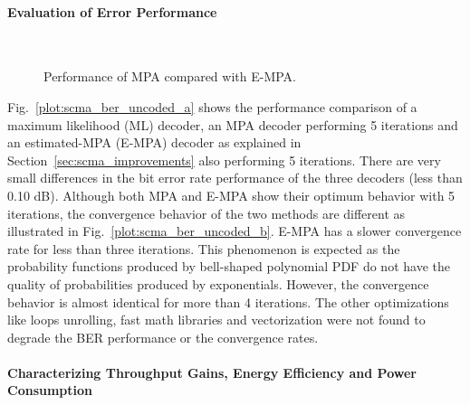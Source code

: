 \paragraph{Evaluation of Error Performance}
\label{sec:scma_performance_evaluation}

\begin{figure}
  \centering
  \\
  \centering
  \caption{Performance of MPA compared with E-MPA.}
  \label{plot:scma_ber_uncoded}
\end{figure}

Fig.~\ref{plot:scma_ber_uncoded_a} shows the performance comparison of a maximum
likelihood (ML) decoder, an MPA decoder performing 5 iterations and an
estimated-MPA (E-MPA) decoder as explained in
Section~\ref{sec:scma_improvements} also performing 5 iterations. There are very
small differences in the bit error rate performance of the three decoders (less
than 0.10 dB). Although both MPA and E-MPA show their optimum behavior with 5
iterations, the convergence behavior of the two methods are different as
illustrated in Fig.~\ref{plot:scma_ber_uncoded_b}. E-MPA has a slower
convergence rate for less than three iterations. This phenomenon is expected as
the probability functions produced by bell-shaped polynomial PDF do not have the
quality of probabilities produced by exponentials. However, the convergence
behavior is almost identical for more than 4 iterations. The other optimizations
like loops unrolling, fast math libraries and vectorization were not found to
degrade the BER performance or the convergence rates.

\paragraph{Characterizing Throughput Gains, Energy Efficiency and Power Consumption}
\label{sec:scma_performance_throughput}

